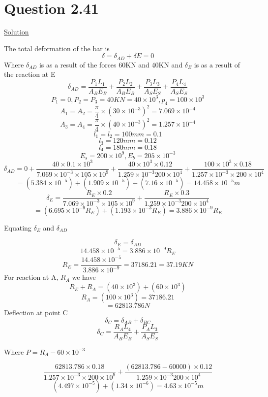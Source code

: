 \documentclass{article}
\begin{document}
\section*{Question 2.41}
\begin{center} \underline{Solution}\end{center}
The total deformation of the bar is
\[\delta =\delta_{AD} + \delta{E} = 0\]
Where $\delta_{AD}$ is as a result of the forces 60KN and 40KN
and $\delta_{E}$ is as a result of the reaction at E
\[\delta_{AD} = \frac{P_{1}L_{1}}{A_{B}E_{B}} + \frac{P_{2}L_{2}}{A_{B}E_{B}} + \frac{P_{3}L_{3}}{A_{S}E_{S}} + \frac{P_{4}L_{4}}{A_{S}E_{S}} \]
\[P_{1} = 0, P_{2}=P_{3}=40KN= 40\times10^{3}, p_{4}=100\times10^{3}\]
\[A_{1} = A_{2} = \frac{\pi}{4}\times(30\times10^{-3})^{2}=7.069\times10^{-4}\]
\[A_{3} = A_{4} = \frac{\pi}{4}\times(40\times10^{-3})^{2}=1.257\times10^{-4}\]
\[l_{1} = l_{2} = 100mm = 0.1\]
\[l_{3} = 120mm = 0.12\]
\[l_{4} = 180mm = 0.18\]
\[E_{s} = 200\times 10^{9}, E_{b} = 205\times10^{-3}\]
\[\delta_{AD} = 0 + \frac{40\times0.1\times10^{3}}{7.069\times10^{-3}\times105\times10^{9}}+\frac{40\times10^{3}\times0.12}{1.259\times10^{-3}200\times10^{4}} + \frac{100\times10^{3}\times0.18}{1.257\times10^{-3}\times200\times10^{4}}\]
\[=(5.384\times10^{-5}) + (1.909\times10^{-5}) + (7.16\times10^{-5}) = 14.458\times10^{-5}m\]
\[\delta_{E} = \frac{R_{E}\times 0.2}{7.069\times10^{-3}\times105\times10^{9}}+\frac{R_{E}\times0.3}{1.259\times10^{-3}200\times10^{4}}\]
\[=(6.695\times10^{-9}R_{E}) + (1.193\times10^{-3}R_{E}) = 3.886\times10^{-9}R_{E}\]
\begin{center} Equating $\delta_{E}$ and $\delta_{AD}$\end{center}
\[\delta_{E}= \delta_{AD}\]
\[ 14.458\times10^{-5}=3.886\times10^{-9}R_{E}\]
\[R_{E} = \frac{14.458\times10^{-5}}{3.886\times10^{-9}} = 37186.21 = 37.19KN\]
For reaction at A, $R_{A}$ we have
\[R_{E}+R_{A} = (40\times10^{3})+(60\times10^{3})\]
\[R_{A} = (100\times10^{3})=37186.21\]
\[=62813.786N\]
Deflection at point C
\[\delta_{C} = \delta_{AB} + \delta_{BC}\]
\[\delta_{C} = \frac{R_{A}L_{4}}{A_{B}E_{B}} + \frac{P_{A}L_{3}}{A_{S}E_{S}}\]
\begin{center} Where $P = R_{A} - 60\times10^{-3}$\end{center}
\[\frac{62813.786 \times 0.18}{1.257\times 10^{-3}\times 200\times 10^{9}}+\frac{(62813.786-60000)\times 0.12}{1.259\times10^{-3}200\times10^{4}}\]
\[(4.497\times10^{-5})+(1.34\times10^{-6})=4.63\times10^{-5}m\]
\end{document}

